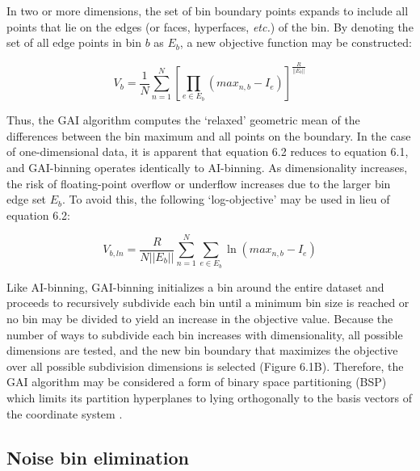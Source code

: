 \begin{doublespace}
In two or more dimensions, the set of bin boundary points expands to include
all points that lie on the edges (or faces, hyperfaces, {\it etc.}) of the bin.
By denoting the set of all edge points in bin $b$ as $E_b$, a new objective
function may be constructed:

\begin{equation}
V_b = \frac{1}{N}
  \sum_{n=1}^N \left[
    \prod_{e \in E_b} (max_{n,b} - I_e)
  \right]^\frac{R}{||E_b||}
\end{equation}

Thus, the GAI algorithm computes the `relaxed' geometric mean of the
differences between the bin maximum and all points on the boundary. In the
case of one-dimensional data, it is apparent that equation 6.2 reduces to
equation 6.1, and GAI-binning operates identically to AI-binning. As
dimensionality increases, the risk of floating-point overflow or underflow
increases due to the larger bin edge set $E_b$. To avoid this, the following
`log-objective' may be used in lieu of equation 6.2:

\begin{equation}
V_{b,ln} = \frac{R}{N ||E_b||}
  \sum_{n=1}^N \sum_{e \in E_b}
    \ln(max_{n,b} - I_e)
\end{equation}

Like AI-binning, GAI-binning initializes a bin around the entire dataset and
proceeds to recursively subdivide each bin until a minimum bin size is reached
or no bin may be divided to yield an increase in the objective value. Because
the number of ways to subdivide each bin increases with dimensionality, all
possible dimensions are tested, and the new bin boundary that maximizes the
objective over all possible subdivision dimensions is selected (Figure 6.1B).
Therefore, the GAI algorithm may be considered a form of binary space
partitioning (BSP) which limits its partition hyperplanes to lying orthogonally
to the basis vectors of the coordinate system \cite{deberg2000}.
\end{doublespace}

\subsection{Noise bin elimination}

